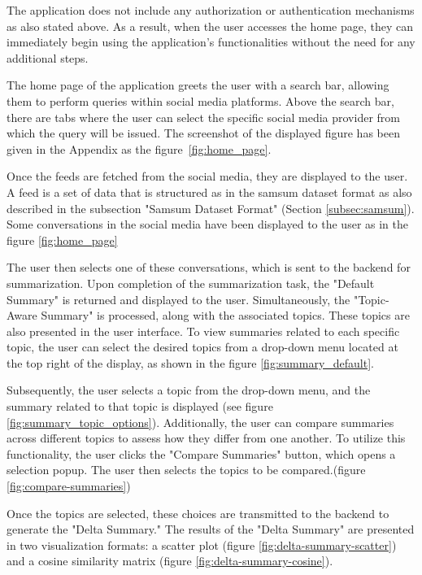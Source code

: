 The application does not include any authorization or authentication mechanisms as also stated above. As a result, when the user accesses the home page, they can immediately begin using the application's functionalities without the need for any additional steps.

The home page of the application greets the user with a search bar, allowing them to perform queries within social media platforms. Above the search bar, there are tabs where the user can select the specific social media provider from which the query will be issued. The screenshot of the displayed figure has been given in the Appendix as the figure~\ref{fig:home_page}.

Once the feeds are fetched from the social media, they are displayed to the user. A feed is a set of data that is structured as in the samsum dataset format as also described in the subsection "Samsum Dataset Format" (Section \ref{subsec:samsum}). Some conversations in the social media have been displayed to the user as in the figure \ref{fig:home_page}

The user then selects one of these conversations, which is sent to the backend for summarization. Upon completion of the summarization task, the "Default Summary" is returned and displayed to the user. Simultaneously, the "Topic-Aware Summary" is processed, along with the associated topics. These topics are also presented in the user interface. To view summaries related to each specific topic, the user can select the desired topics from a drop-down menu located at the top right of the display, as shown in the figure \ref{fig:summary_default}.

Subsequently, the user selects a topic from the drop-down menu, and the summary related to that topic is displayed (see figure \ref{fig:summary_topic_options}). Additionally, the user can compare summaries across different topics to assess how they differ from one another. To utilize this functionality, the user clicks the "Compare Summaries" button, which opens a selection popup. The user then selects the topics to be compared.(figure \ref{fig:compare-summaries})

Once the topics are selected, these choices are transmitted to the backend to generate the "Delta Summary." The results of the "Delta Summary" are presented in two visualization formats: a scatter plot (figure \ref{fig:delta-summary-scatter}) and a cosine similarity matrix (figure \ref{fig:delta-summary-cosine}).
